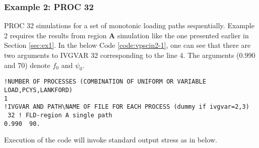 \documentclass[12pt]{amsart}
\begin{document}
\subsubsection{Example 2: PROC 32}
\label{sec:ex2}
PROC 32 simulations for a set of monotonic loading paths sequentially.
Example 2 requires the results from region \textbf{A} simulation like the one presented earlier in Section \ref{sec:ex1}.
In the below Code \ref{code:vpscin2-1}, one can see that there are two arguments to IVGVAR 32 corresponding to the line 4.
The arguments (0.990 and 70) denote $f_0$ and $\psi_0$.
\begin{lstlisting}[style=inp, caption=A portion of the input file vpsc7.in prepared for IVGVAR 32, label={code:vpscin2-1}]
!NUMBER OF PROCESSES (COMBINATION OF UNIFORM OR VARIABLE LOAD,PCYS,LANKFORD)
1
!IVGVAR AND PATH\NAME OF FILE FOR EACH PROCESS (dummy if ivgvar=2,3)
 32 ! FLD-region A single path
0.990  90.
\end{lstlisting}
Execution of the code will invoke standard output stress as in below.
\end{document}
